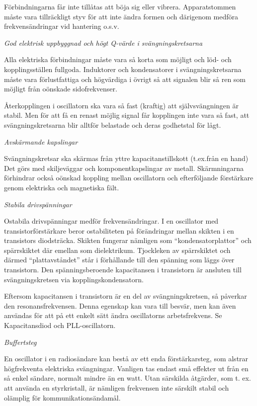 Förbindningarna får inte tillåtas att böja sig eller
vibrera. Apparatstommen måste vara tillräckligt styv för att inte
ändra formen och därigenom medföra frekvensändringar vid hantering
o.s.v.

\emph{God elektrisk uppbyggnad och högt Q-värde i svängningskretsarna}

Alla elektriska förbindningar måste vara så korta som möjligt och löd-
och kopplingsställen fullgoda. Induktorer och kondensatorer i
svängningskretsarna måste vara förlustfattiga och högvärdiga i övrigt
så att signalen blir så ren som möjligt från oönskade sidofrekvenser.

Återkopplingen i oscillatorn ska vara så fast (kraftig) att
självsvängningen är stabil.  Men för att få en renast möjlig signal
får kopplingen inte vara så fast, att svängningskretsarna blir alltför
belastade och deras godhetstal för lågt.

\emph{Avskärmande kapslingar}

Svängningskretsar ska skärmas från yttre kapacitanstillskott
(t.ex.från en hand) Det görs med skiljeväggar och komponentkapslingar
av metall. Skärmningarna förhindrar också oönskad koppling mellan
oscillatorn och efterföljande förstärkare genom elektriska och
magnetiska fält.

\emph{Stabila drivspänningar}

Ostabila drivspänningar medför frekvensändringar. I en oscillator med
transistorförstärkare beror ostabiliteten på förändringar mellan
skikten i en transistors diodsträcka.  Skikten fungerar nämligen som
``kondensatorplattor'' och spärrskiktet där emellan som
dielektrikum. Tjockleken av spärrskiktet och därmed ``plattavståndet''
står i förhållande till den spänning som läggs över transistorn.  Den
spänningsberoende kapacitansen i transistorn är ansluten till
svängningskretsen via kopplingskondensatorn.

Eftersom kapacitansen i transistorn är en del av svängningskretsen, så
påverkar den resonansfrekvensen. Denna egenskap kan vara till besvär,
men kan även användas för att på ett enkelt sätt ändra oscillatorns
arbetsfrekvens.  Se Kapacitansdiod och PLL-oscillatorn.

\emph{Buffertsteg}

En oscillator i en radiosändare kan bestå av ett enda förstärkarsteg,
som alstrar högfrekventa elektriska svängningar. Vanligen tas endast
små effekter ut från en så enkel sändare, normalt mindre än en
watt. Utan särskilda åtgärder, som t. ex. att använda en styrkristall,
är nämligen frekvensen inte särskilt stabil och olämplig för
kommunikationsändamål.


